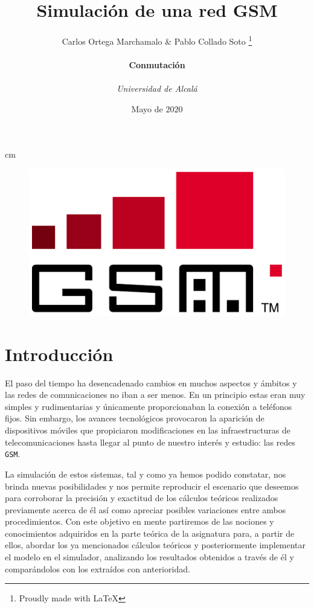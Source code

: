 \documentclass[10pt]{article}
\title{\textbf{Simulación de una red GSM}}
\author{Carlos Ortega Marchamalo \& Pablo Collado Soto \thanks{Proudly made with \LaTeX} \\ \\ \textbf{Conmutación} \\ \\ \textit{Universidad de Alcalá}}
\date{Mayo de $2020$}
\begin{document}
	\begin{titlingpage}
		\maketitle
		 cm
		\begin{figure}[!htb]
			\centering
			\includegraphics[width=0.75\linewidth]{GSM_logo.png}
		\end{figure}
	\end{titlingpage}

	\newpage
	\tableofcontents
	\newpage

	\section{Introducción}
		El paso del tiempo ha desencadenado cambios en muchos aspectos y ámbitos y las redes de comunicaciones no iban a ser menos. En un principio estas eran muy simples y rudimentarias y únicamente proporcionaban la conexión a teléfonos fijos. Sin embargo, los avances tecnológicos provocaron la aparición de dispositivos móviles que propiciaron modificaciones en las infraestructuras de telecomunicaciones hasta llegar al punto de nuestro interés y estudio: las redes \texttt{GSM}.

		La simulación de estos sistemas, tal y como ya hemos podido constatar, nos brinda nuevas posibilidades y nos permite reproducir el escenario que deseemos para corroborar la precisión y exactitud de los cálculos teóricos realizados previamente acerca de él así como apreciar posibles variaciones entre ambos procedimientos. Con este objetivo en mente partiremos de las nociones y conocimientos adquiridos en la parte teórica de la asignatura para, a partir de ellos, abordar los ya mencionados cálculos teóricos y posteriormente implementar el modelo en el simulador, analizando los resultados obtenidos a través de él y comparándolos con los extraídos con anterioridad.
\end{document}
